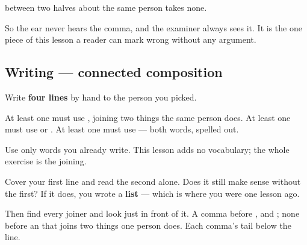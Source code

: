 \textbf{} between two halves about the same person takes none.

So the ear never hears the comma, and the examiner always sees it. It is the one piece of this lesson a reader can mark wrong without any argument.

\subsection*{Writing — connected composition}
Write \textbf{four lines} by hand to the person you picked.

At least one must use \textbf{}, joining two things the same person does. At least one must use \textbf{} or \textbf{}. At least one must use \textbf{ } — both words, spelled out.

Use only words you already write. This lesson adds no vocabulary; the whole exercise is the joining.

\begin{tcolorbox}[breakable,colback=teal!4,colframe=teal!35!black,title={Before you move on}]
Cover your first line and read the second alone. Does it still make sense without the first? If it does, you wrote a \textbf{list} — which is where you were one lesson ago.

Then find every joiner and look just in front of it. A comma before \textbf{}, \textbf{} and \textbf{}; none before an \textbf{} that joins two things one person does. Each comma's tail below the line.
\end{tcolorbox}
